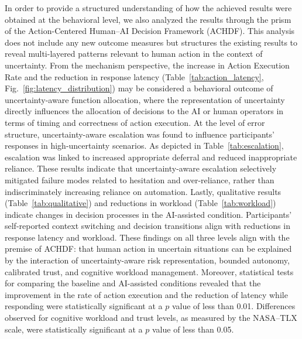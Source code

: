 \documentclass[journal]{IEEEtran}
\theoremstyle{plain}
\theoremstyle{definition}
\begin{document}
    In order to provide a structured understanding of how the achieved results were obtained at the behavioral level, we also analyzed the results through the prism of the Action-Centered Human--AI Decision Framework (ACHDF). This analysis does not include any new outcome measures but structures the existing results to reveal multi-layered patterns relevant to human action in the context of uncertainty.
    From the mechanism perspective, the increase in Action Execution Rate and the reduction in response latency (Table~\ref{tab:action_latency}, Fig.~\ref{fig:latency_distribution}) may be considered a behavioral outcome of uncertainty-aware function allocation, where the representation of uncertainty directly influences the allocation of decisions to the AI or human operators in terms of timing and correctness of action execution.
    At the level of error structure, uncertainty-aware escalation was found to influence participants’ responses in high-uncertainty scenarios. As depicted in Table~\ref{tab:escalation}, escalation was linked to increased appropriate deferral and reduced inappropriate reliance. These results indicate that uncertainty-aware escalation selectively mitigated failure modes related to hesitation and over-reliance, rather than indiscriminately increasing reliance on automation.
    Lastly, qualitative results (Table~\ref{tab:qualitative}) and reductions in workload (Table~\ref{tab:workload}) indicate changes in decision processes in the AI-assisted condition. Participants’ self-reported context switching and decision transitions align with reductions in response latency and workload. These findings on all three levels align with the premise of ACHDF: that human action in uncertain situations can be explained by the interaction of uncertainty-aware risk representation, bounded autonomy, calibrated trust, and cognitive workload management.
    Moreover, statistical tests for comparing the baseline and AI-assisted conditions revealed that the improvement in the rate of action execution and the reduction of latency while responding were statistically significant at a $p$ value of less than 0.01. Differences observed for cognitive workload and trust levels, as measured by the NASA--TLX scale, were statistically significant at a $p$ value of less than 0.05.

\end{document}
